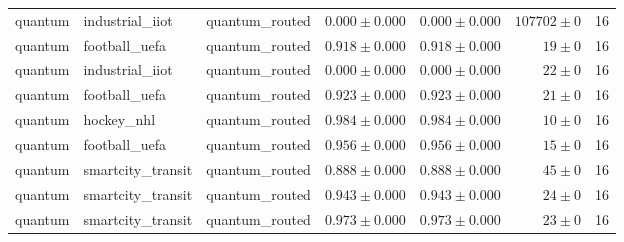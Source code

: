 \begin{table}[htbp]
\begin{tabular}{l l l r r r r}
quantum & industrial\_iiot & quantum\_routed & $0.000\pm0.000$ & $0.000\pm0.000$ & $107702\pm0$ & 16 \\
quantum & football\_uefa & quantum\_routed & $0.918\pm0.000$ & $0.918\pm0.000$ & $19\pm0$ & 16 \\
quantum & industrial\_iiot & quantum\_routed & $0.000\pm0.000$ & $0.000\pm0.000$ & $22\pm0$ & 16 \\
quantum & football\_uefa & quantum\_routed & $0.923\pm0.000$ & $0.923\pm0.000$ & $21\pm0$ & 16 \\
quantum & hockey\_nhl & quantum\_routed & $0.984\pm0.000$ & $0.984\pm0.000$ & $10\pm0$ & 16 \\
quantum & football\_uefa & quantum\_routed & $0.956\pm0.000$ & $0.956\pm0.000$ & $15\pm0$ & 16 \\
quantum & smartcity\_transit & quantum\_routed & $0.888\pm0.000$ & $0.888\pm0.000$ & $45\pm0$ & 16 \\
quantum & smartcity\_transit & quantum\_routed & $0.943\pm0.000$ & $0.943\pm0.000$ & $24\pm0$ & 16 \\
quantum & smartcity\_transit & quantum\_routed & $0.973\pm0.000$ & $0.973\pm0.000$ & $23\pm0$ & 16 \\
\hline
\end{tabular}
\end{table}
